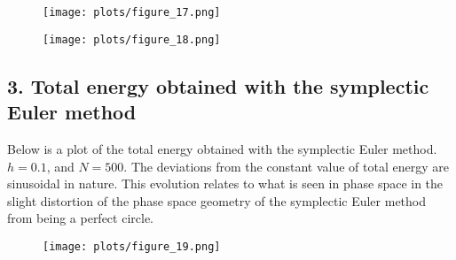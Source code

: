 \documentclass{article}
\begin{document}
\begin{figure}[H]
\centering
\texttt{[image: plots/figure\_17.png]}
\end{figure}

\begin{figure}[H]
\centering
\texttt{[image: plots/figure\_18.png]}
\end{figure}

\subsection*{3. Total energy obtained with the symplectic Euler method}
Below is a plot of the total energy obtained with the symplectic Euler method. $h = 0.1$, and $N = 500$. The deviations from the constant value of total energy are sinusoidal in nature. This evolution relates to what is seen in phase space in the slight distortion of the phase space geometry of the symplectic Euler method from being a perfect circle.

\begin{figure}[H]
\centering
\texttt{[image: plots/figure\_19.png]}
\end{figure}
\end{document}
